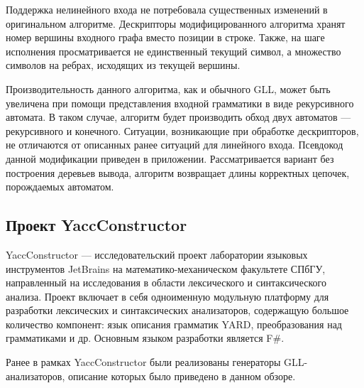 Поддержка нелинейного входа не потребовала существенных изменений в оригинальном алгоритме. Дескрипторы модифицированного алгоритма хранят номер вершины входного графа вместо позиции в строке. Также, на шаге исполнения просматривается не единственный текущий символ, а множество символов на ребрах, исходящих из текущей вершины.

Производительность данного алгоритма, как и обычного GLL, может быть увеличена при помощи представления входной грамматики в виде рекурсивного автомата. В таком случае, алгоритм будет производить обход двух автоматов --- рекурсивного и конечного. Ситуации, возникающие при обработке дескрипторов, не отличаются от описанных ранее ситуаций для линейного входа. Псевдокод данной модификации приведен в приложении. Рассматривается вариант без построения деревьев вывода, алгоритм возвращает длины корректных цепочек, порождаемых автоматом. 

\subsection{Проект YaccConstructor}

YaccConstructor --- исследовательский проект лаборатории языковых инструментов JetBrains на математико-механическом факультете СПбГУ, направленный на исследования в области лексического и синтаксического анализа. Проект включает в себя одноименную модульную платформу для разработки лексических и синтаксических анализаторов, содержащую большое количество компонент: язык описания грамматик YARD, преобразования над грамматиками и др. Основным языком разработки является F$\#$.

Ранее в рамках YaccConstructor были реализованы генераторы GLL-анализаторов, описание которых было приведено в данном обзоре. 

